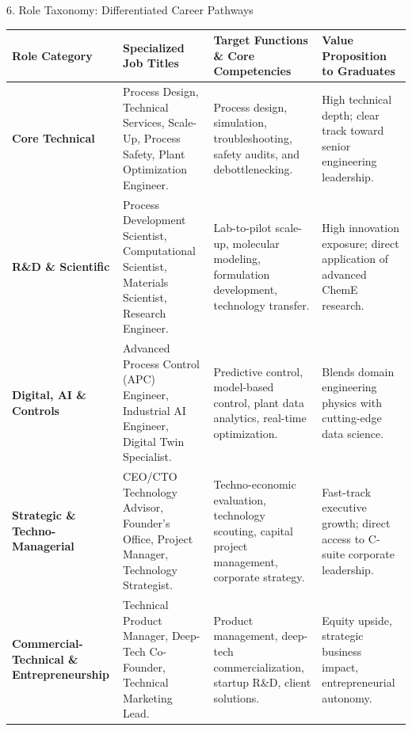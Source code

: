 \documentclass[aspectratio=169, 10pt]{beamer}
\begin{document}
\begin{frame}{6. Role Taxonomy: Differentiated Career Pathways}
  \scriptsize
  \renewcommand{\arraystretch}{1.2}
  \centering
  \begin{tabular}{L{2.3cm} L{3.5cm} L{4.4cm} L{3.7cm}}
    \toprule
    \textbf{Role Category} & \textbf{Specialized Job Titles} & \textbf{Target Functions \& Core Competencies} & \textbf{Value Proposition to Graduates} \\
    \midrule
    \textbf{Core Technical} & Process Design, Technical Services, Scale-Up, Process Safety, Plant Optimization Engineer. & Process design, simulation, troubleshooting, safety audits, and debottlenecking. & High technical depth; clear track toward senior engineering leadership. \\
    \addlinespace[2pt]
    \textbf{R\&D \& Scientific} & Process Development Scientist, Computational Scientist, Materials Scientist, Research Engineer. & Lab-to-pilot scale-up, molecular modeling, formulation development, technology transfer. & High innovation exposure; direct application of advanced ChemE research. \\
    \addlinespace[2pt]
    \textbf{Digital, AI \& Controls} & Advanced Process Control (APC) Engineer, Industrial AI Engineer, Digital Twin Specialist. & Predictive control, model-based control, plant data analytics, real-time optimization. & Blends domain engineering physics with cutting-edge data science. \\
    \addlinespace[2pt]
    \textbf{Strategic \& Techno-Managerial} & CEO/CTO Technology Advisor, Founder’s Office, Project Manager, Technology Strategist. & Techno-economic evaluation, technology scouting, capital project management, corporate strategy. & Fast-track executive growth; direct access to C-suite corporate leadership. \\
    \addlinespace[2pt]
    \textbf{Commercial-Technical \& Entrepreneurship} & Technical Product Manager, Deep-Tech Co-Founder, Technical Marketing Lead. & Product management, deep-tech commercialization, startup R\&D, client solutions. & Equity upside, strategic business impact, entrepreneurial autonomy. \\
    \bottomrule
  \end{tabular}
\end{frame}
\end{document}

